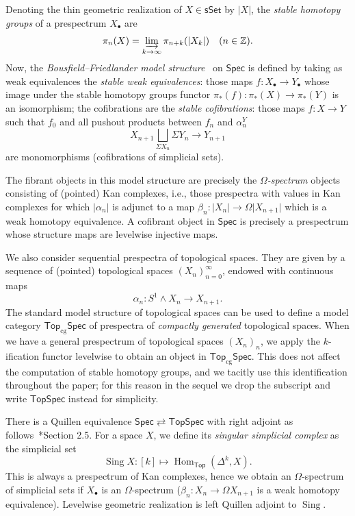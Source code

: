 \documentclass[a4paper,reqno]{amsart}
\theoremstyle{plain}
\theoremstyle{definition}
\theoremstyle{remark}
\numberwithin{equation}{section}
\newcommand{\dZ}{\mathbb{Z}}
\newcommand{\Top}{\mathsf{Top}}
\newcommand{\sSet}{\mathsf{sSet}}
\newcommand{\Spec}{\mathsf{Spec}}
\newcommand{\TopSpec}{\mathsf{TopSpec}}
\newcommand{\TopCGSpec}{\mathsf{Top}_\mathrm{cg}\mathsf{Spec}}
\newcommand{\gr}[1]{\lvert #1\rvert}
\DeclareMathOperator{\Sing}{Sing}
\DeclareMathOperator{\Hom}{Hom}
\begin{document}
Denoting the thin geometric realization of $X \in \sSet$ by $\gr{X}$, the \emph{stable homotopy groups} of a prespectrum $X_\bullet$ are
\begin{equation*}
  \pi_n(X) = \varinjlim_{k\to\infty} \pi_{n+k}(\gr{X_k}) \quad (n \in \dZ).
\end{equation*}
Now, the \emph{Bousfield--Friedlander model structure}~\cite{bf:spectra} on $\Spec$ is defined by taking as weak equivalences the \emph{stable weak equivalences}: those maps $f\colon X_\bullet \to Y_\bullet$ whose image under the stable homotopy groups functor $\pi_*(f)\colon \pi_*(X)\to\pi_*(Y)$ is an isomorphism; the cofibrations are the \emph{stable cofibrations}: those maps $f\colon X\to Y$ such that $f_0$ and all pushout products between $f_n$ and $\alpha_n^Y$
\begin{equation*}
  X_{n+1}\bigsqcup _{\Sigma X_n} \Sigma Y_n \to Y_{n+1}
\end{equation*}
are monomorphisms (cofibrations of simplicial sets).

The fibrant objects in this model structure are precisely the \emph{$\Omega$-spectrum} objects consisting of (pointed) Kan complexes, i.e., those prespectra with values in Kan complexes for which $\gr{\alpha_n}$ is adjunct to a map $\beta_n \colon \gr{X_n}\to \Omega \gr{X_{n+1}}$ which is a weak homotopy equivalence.
A cofibrant object in $\Spec$ is precisely a prespectrum whose structure maps are levelwise injective maps.

We also consider sequential prespectra of topological spaces.
They are given by a sequence of (pointed) topological spaces $(X_n)_{n = 0}^\infty$, endowed with continuous maps
\[
\alpha_n \colon S^1 \wedge X_n \to X_{n + 1}.
\]
The standard model structure of topological spaces can be used to define a model category $\TopCGSpec$ of prespectra of \emph{compactly generated} topological spaces.
When we have a general prespectrum of topological spaces $(X_n)_n$, we apply the $k$-ification functor levelwise to obtain an object in $\TopCGSpec$.
This does not affect the computation of stable homotopy groups, and we tacitly use this identification throughout the paper; for this reason in the sequel we drop the subscript and write $\TopSpec$ instead for simplicity.

There is a Quillen equivalence $\Spec \rightleftarrows \TopSpec$ with right adjoint as follows~\cite{bf:spectra}*{Section 2.5}. For a space $X$, we define its \emph{singular simplicial complex} as the simplicial set 
\[
\Sing X\colon [k]\mapsto \Hom_{\Top}(\Delta^k,X).
\]
This is always a prespectrum of Kan complexes, hence we obtain an $\Omega$-spectrum of simplicial sets if $X_\bullet$ is an $\Omega$-spectrum ($\beta_n \colon X_n \to \Omega X_{n + 1}$ is a weak homotopy equivalence). Levelwise geometric realization is left Quillen adjoint to $\Sing$.
\end{document}
